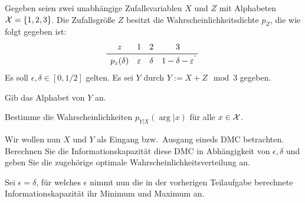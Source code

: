 \documentclass{article}
\begin{document}
\begin{exercise}[Informationskapazität]
    Gegeben seien zwei unabhängige Zufallsvariablen $X$ und $Z$ mit Alphabeten $\cX=\set{1,2,3}$. Die Zufallsgröße $Z$ besitzt die Wahrscheinlichkeitsdichte $p_Z$, die wie folgt gegeben ist:
    $$
    \begin{matrix}
        z & 1 & 2 & 3\\
        \midrule
        p_z(\delta) & \epsilon & \delta & 1 -\delta-\epsilon
    \end{matrix}.
    $$
    Es soll $\epsilon,\delta\in[0,1/2]$ gelten. Es sei $Y$ durch $Y:=X+Z \mod 3$ gegeben.
    \begin{tasks}
            \item Gib das Alphabet von $Y$ an.
            \item Bestimme die Wahrscheinlichkeiten $p_{Y|X}(\arg|x)$ für alle $x\in\mathcal{X}$.
            \item Wir wollen nun $X$ und $Y$ als Eingang bzw.~Ausgang eineds DMC betrachten. Berechnen Sie die Informationskapazität diese DMC in Abhängigkeit von $\epsilon, \delta$ und geben Sie die zugehörige optimale Wahrscheinlichkeitsverteilung an.
        \item Sei $\epsilon=\delta$, für welches $\epsilon$ nimmt nun die in der vorherigen Teilaufgabe berechnete Informationskapazität ihr Minimum und Maximum an.
    \end{tasks}
\end{exercise}
\end{document}
